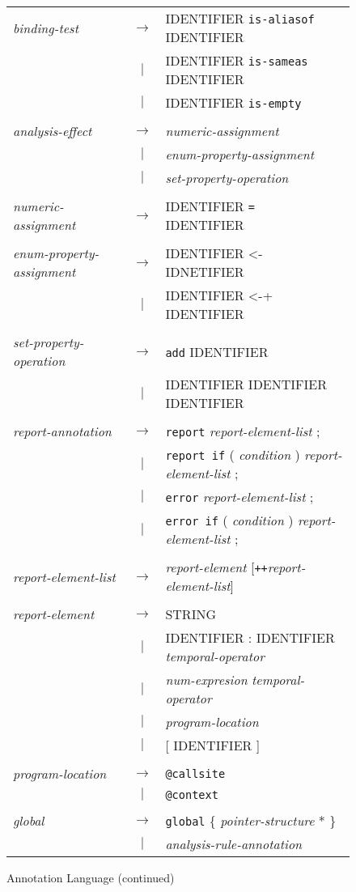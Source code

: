 \documentclass[times, 10pt]{article}
\begin{document}
\begin{figure}
\begin{tabular}[c]{l c l}
{\it binding-test} & $\rightarrow$ & IDENTIFIER {\tt is-aliasof} IDENTIFIER \\
& $|$ & IDENTIFIER {\tt is-sameas} IDENTIFIER \\
& $|$ & IDENTIFIER {\tt is-empty} \\
\\
{\it analysis-effect} & $\rightarrow$ & {\it numeric-assignment} \\
& $|$ & {\it enum-property-assignment} \\
& $|$ & {\it set-property-operation} \\
\\
{\it numeric-assignment} & $\rightarrow$ & IDENTIFIER {\tt = } IDENTIFIER \\
\\
{\it enum-property-assignment} & $\rightarrow$ & IDENTIFIER \textless{}- IDNETIFIER \\
& $|$ & IDENTIFIER \textless{}-+ IDENTIFIER \\
\\
{\it set-property-operation} & $\rightarrow$ & {\tt add} IDENTIFIER \\
& $|$ & IDENTIFIER IDENTIFIER IDENTIFIER \\
\\
{\it report-annotation} & $\rightarrow$ & {\tt report} {\it report-element-list} ; \\
& $|$ & {\tt report if} ( {\it condition} ) {\it report-element-list} ; \\
& $|$ & {\tt error} {\it report-element-list} ; \\
& $|$ & {\tt error if} ( {\it condition} ) {\it report-element-list} ; \\
\\
{\it report-element-list} & $\rightarrow$ & {\it report-element} [{\tt ++}{\it report-element-list}] \\
\\
{\it report-element} & $\rightarrow$ & STRING \\
& $|$ & IDENTIFIER : IDENTIFIER {\it temporal-operator} \\
& $|$ & {\it num-expresion} {\it temporal-operator} \\
& $|$ & {\it program-location} \\
& $|$ & [ IDENTIFIER ] \\
\\
{\it program-location} & $\rightarrow$ & {\tt @callsite} \\
& $|$ & {\tt @context} \\
\\
{\it global} & $\rightarrow$ & {\tt global} \{ {\it pointer-structure} * \} \\
& $|$ & {\it analysis-rule-annotation} \\
\end{tabular}
\caption{Annotation Language (continued)}
\label{annbnf3}
\end{figure}
\end{document}
